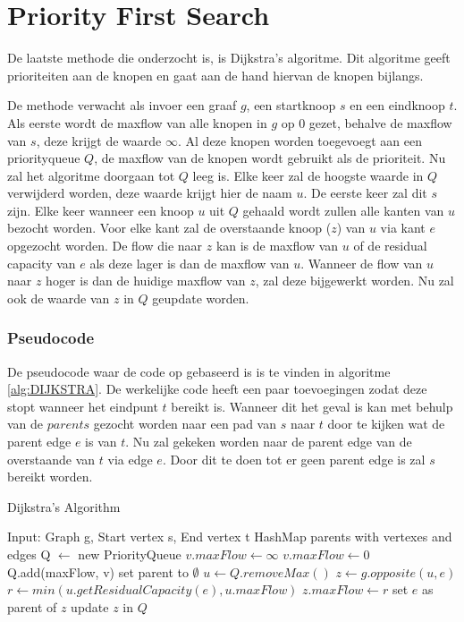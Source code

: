 \chapter{Priority First Search}
\label{chap:priorityfirst}

De laatste methode die onderzocht is, is Dijkstra's algoritme. Dit algoritme geeft prioriteiten aan de knopen en gaat aan de hand hiervan de knopen bijlangs.

De methode verwacht als invoer een graaf $g$, een startknoop $s$ en een eindknoop $t$.
Als eerste wordt de maxflow van alle knopen in $g$ op 0 gezet, behalve de maxflow van $s$, deze krijgt de waarde $\infty$. Al deze knopen worden toegevoegt aan een priorityqueue $Q$, de maxflow van de knopen wordt gebruikt als de prioriteit.
Nu zal het algoritme doorgaan tot $Q$ leeg is. Elke keer zal de hoogste waarde in $Q$ verwijderd worden, deze waarde krijgt hier de naam $u$. De eerste keer zal dit $s$ zijn. Elke keer wanneer een knoop $u$ uit $Q$ gehaald wordt zullen alle kanten van $u$ bezocht worden. Voor elke kant zal de overstaande knoop ($z$) van $u$ via kant $e$ opgezocht worden. De flow die naar $z$ kan is de maxflow van $u$ of de residual capacity van $e$ als deze lager is dan de maxflow van $u$. Wanneer de flow van $u$ naar $z$ hoger is dan de huidige maxflow van $z$, zal deze bijgewerkt worden. Nu zal ook de waarde van $z$ in $Q$ geupdate worden.

\subsection{Pseudocode}
De pseudocode waar de code op gebaseerd is is te vinden in algoritme \ref{alg:DIJKSTRA}.
De werkelijke code heeft een paar toevoegingen zodat deze stopt wanneer het eindpunt $t$ bereikt is. Wanneer dit het geval is kan met behulp van de $parents$ gezocht worden naar een pad van $s$ naar $t$ door te kijken wat de parent edge $e$ is van $t$. Nu zal gekeken worden naar de parent edge van de overstaande van $t$ via edge $e$. Door dit te doen tot er geen parent edge is zal $s$ bereikt worden.

\begin{algorithm}[h]
\caption{Dijkstra's Algorithm}
\label{alg:DIJKSTRA}
\begin{algorithmic}
\REQUIRE Input: Graph g, Start vertex s, End vertex t
\STATE HashMap parents with vertexes and edges
\STATE Q $\gets$ new PriorityQueue
\STATE $v.maxFlow \gets \infty$
\ELSE
\STATE $v.maxFlow \gets 0$
\ENDIF
\STATE Q.add(maxFlow, v)
\STATE set parent to $\emptyset$
\ENDFOR
{}
\STATE $u \gets Q.removeMax()$
\STATE $z \gets g.opposite(u, e)$
\STATE $r \gets min(u.getResidualCapacity(e), u.maxFlow)$
\STATE $z.maxFlow \gets r$
\STATE set $e$ as parent of $z$
\STATE update $z$ in $Q$
\ENDIF
\ENDFOR
\ENDWHILE
\end{algorithmic}
\end{algorithm}

